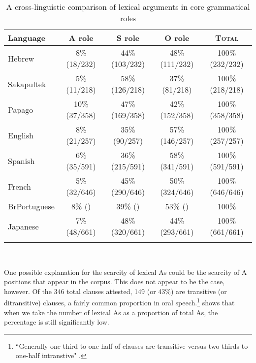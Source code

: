 \begin{table}

\caption{{A cross-linguistic comparison of lexical arguments in core grammatical roles}} 
\begin{tabular}{| l  c  c  c  c }
\lsptoprule
Language & A role & S role & O role & \textsc{Total} \\

\midrule
 Hebrew & 8{\%} (18/232) & 44{\%}(103/232) & 48{\%} (111/232) & 100{\%} (232/232) \\
  
\midrule
 Sakapultek & 5{\%} (11/218) & 58{\%} (126/218)  & 37{\%} (81/218) &  100{\%} (218/218)  \\

\midrule
Papago & 10{\%} (37/358) & 47{\%} (169/358)  & 42{\%} (152/358)  &  100{\%} (358/358) \\

\midrule
English & 8{\%} (21/257) & 35{\%} (90/257)  & 57{\%} (146/257)  &  100{\%} (257/257) \\

\midrule
Spanish & 6{\%} (35/591) & 36{\%} (215/591)  & 58{\%} (341/591)  &  100{\%} (591/591) \\

\midrule
French & 5{\%} (32/646) & 45{\%} (290/646)  & 50{\%} (324/646)  &  100{\%} (646/646)  \\

\midrule
BrPortuguese & 8{\%} () & 39{\%} ()  & 53{\%} ()  &  100{\%}  \\

\midrule
Japanese & 7{\%} (48/661) & 48{\%} (320/661)  & 44{\%} (293/661)  &  100{\%} (661/661) \\

\lspbottomrule
\end{tabular}\\
\label{crossgeneraldist}

\end{table}


One possible explanation for the scarcity of lexical As could be the scarcity of A positions that appear in the corpus. This does not appear to be the case, however. Of the 346 total clauses attested, 149 (or 43{\%}) are transitive (or ditransitive) clauses, a fairly common proportion in oral speech.\footnote{``Generally one-third to one-half of clauses are transitive versus two-thirds to one-half intranstive"  \citep[63-64]{dubois2003a}.}  shows that when we take the number of lexical As as a proportion of total As, the percentage is still significantly low.


